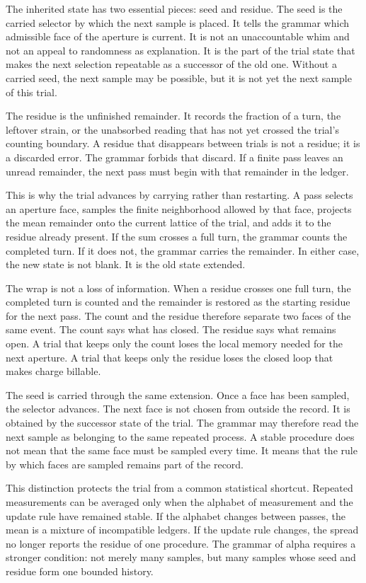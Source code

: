 The inherited state has two essential pieces: seed and residue. The seed is
the carried selector by which the next sample is placed. It tells the grammar
which admissible face of the aperture is current. It is not an unaccountable
whim and not an appeal to randomness as explanation. It is the part of the
trial state that makes the next selection repeatable as a successor of the
old one. Without a carried seed, the next sample may be possible, but it is
not yet the next sample of this trial.

The residue is the unfinished remainder. It records the fraction of a turn,
the leftover strain, or the unabsorbed reading that has not yet crossed the
trial's counting boundary. A residue that disappears between trials is not a
residue; it is a discarded error. The grammar forbids that discard. If a
finite pass leaves an unread remainder, the next pass must begin with that
remainder in the ledger.

This is why the trial advances by carrying rather than restarting. A pass
selects an aperture face, samples the finite neighborhood allowed by that
face, projects the mean remainder onto the current lattice of the trial, and
adds it to the residue already present. If the sum crosses a full turn, the
grammar counts the completed turn. If it does not, the grammar carries the
remainder. In either case, the new state is not blank. It is the old state
extended.

The wrap is not a loss of information. When a residue crosses one full turn,
the completed turn is counted and the remainder is restored as the starting
residue for the next pass. The count and the residue therefore separate two
faces of the same event. The count says what has closed. The residue says
what remains open. A trial that keeps only the count loses the local memory
needed for the next aperture. A trial that keeps only the residue loses the
closed loop that makes charge billable.

The seed is carried through the same extension. Once a face has been sampled,
the selector advances. The next face is not chosen from outside the record.
It is obtained by the successor state of the trial. The grammar may therefore
read the next sample as belonging to the same repeated process. A stable
procedure does not mean that the same face must be sampled every time. It
means that the rule by which faces are sampled remains part of the record.

This distinction protects the trial from a common statistical shortcut.
Repeated measurements can be averaged only when the alphabet of measurement
and the update rule have remained stable. If the alphabet changes between
passes, the mean is a mixture of incompatible ledgers. If the update rule
changes, the spread no longer reports the residue of one procedure. The
grammar of alpha requires a stronger condition: not merely many samples, but
many samples whose seed and residue form one bounded history.

